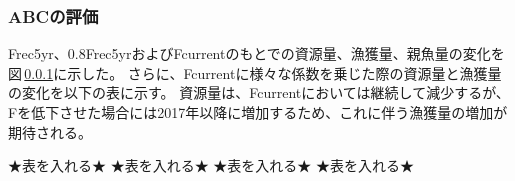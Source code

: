 \documentclass[_TypesetMe]{subfiles}
\begin{document}
\subsubsection{ABCの評価}
Frec5yr、0.8Frec5yrおよびFcurrentのもとでの資源量、漁獲量、親魚量の変化を図\,\ref{}に示した。
さらに、Fcurrentに様々な係数を乗じた際の資源量と漁獲量の変化を以下の表に示す。
資源量は、Fcurrentにおいては継続して減少するが、Fを低下させた場合には2017年以降に増加するため、これに伴う漁獲量の増加が期待される。

★表を入れる★
★表を入れる★
★表を入れる★
★表を入れる★
\end{document}
